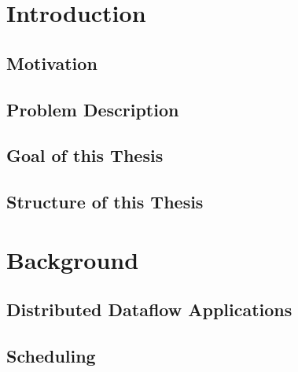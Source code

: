 



\newcommand{\titleLineOne}{Implentation of an simplistic Interface for}
\newcommand{\titleLineTwo}{  Big Data Workload Scheduler in Kubernetes}
\newcommand{\titleLineThree}{}
\newcommand{\documentdate}{December 22, 2015}
\newcommand{\studentname}{Lukas Schwerdtfeger}
\newcommand{\abstracttextde}{Kurze Zusammenfassung der Arbeit in 250 W\"ortern.}
\newcommand{\abstracttext}{Short version of the thesis in 250 words.}
\newcommand{\acktext}{This chapter is optional. First of all, I would like to...}
\providecommand{\tightlist}{%
  \setlength{\itemsep}{0pt}\setlength{\parskip}{0pt}}


 





\chapter{Introduction}
\section{Motivation}

\section{Problem Description}

\section{Goal of this Thesis}

\section{Structure of this Thesis}



\chapter{Background}
\section{Distributed Dataflow Applications}

\section{Scheduling}

